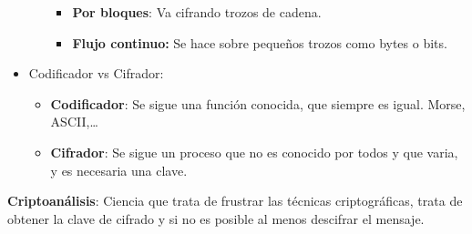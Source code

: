 \documentclass[12pt, twoside, openright]{report} %
\begin{document}
\begin{itemize}
\begin{itemize}
      \begin{itemize}
      \item \textbf{Por bloques}: Va cifrando trozos de cadena.
        
      \item \textbf{Flujo continuo:} Se hace sobre pequeños trozos como
        bytes o bits.
        
      \end{itemize}
    \end{itemize}
	\pagebreak
  \item Codificador vs Cifrador:
    
    \begin{itemize}
    \item \textbf{Codificador}: Se sigue una función conocida, que siempre
      es igual. Morse, ASCII,\ldots{}
      
    \item \textbf{Cifrador}: Se sigue un proceso que no es conocido por
      todos y que varia, y es necesaria una clave.
      
    \end{itemize}
  \end{itemize}

  
  \textbf{Criptoanálisis}: Ciencia que trata de frustrar las técnicas
  criptográficas, trata de obtener la clave de cifrado y si no es
  posible al menos descifrar el mensaje.
  
\end{document}
